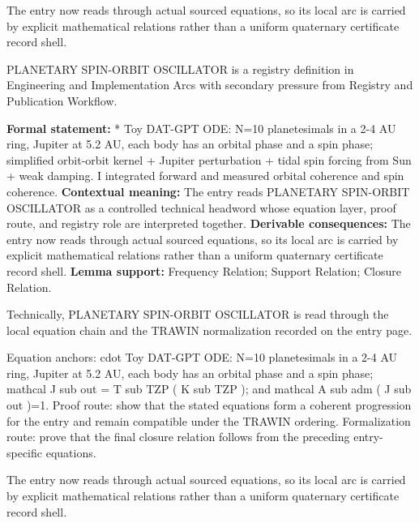 The entry now reads through actual sourced equations, so its local arc is carried by explicit mathematical relations rather than a uniform quaternary certificate record shell.
\clearpage


\begingroup\small
{}
PLANETARY SPIN-ORBIT OSCILLATOR is a registry definition in Engineering and Implementation Arcs with secondary pressure from Registry and Publication Workflow.

\begingroup\footnotesize\setlength{\emergencystretch}{3em}\sloppy
\textbf{Formal statement:} * Toy DAT-GPT ODE: N=10 planetesimals in a 2-4 AU ring, Jupiter at 5.2 AU, each body has an orbital phase and a spin phase; simplified orbit-orbit kernel + Jupiter perturbation + tidal spin forcing from Sun + weak damping. I integrated forward and measured orbital coherence and spin coherence. \textbf{Contextual meaning:} The entry reads PLANETARY SPIN-ORBIT OSCILLATOR as a controlled technical headword whose equation layer, proof route, and registry role are interpreted together. \textbf{Derivable consequences:} The entry now reads through actual sourced equations, so its local arc is carried by explicit mathematical relations rather than a uniform quaternary certificate record shell. \textbf{Lemma support:} Frequency Relation; Support Relation; Closure Relation.\par
\endgroup

Technically, PLANETARY SPIN-ORBIT OSCILLATOR is read through the local equation chain and the TRAWIN normalization recorded on the entry page.

Equation anchors: cdot Toy DAT-GPT ODE: N=10 planetesimals in a 2-4 AU ring, Jupiter at 5.2 AU, each body has an orbital phase and a spin phase; mathcal J sub out = T sub TZP ( K sub TZP ); and mathcal A sub adm ( J sub out )=1. Proof route: show that the stated equations form a coherent progression for the entry and remain compatible under the TRAWIN ordering. Formalization route: prove that the final closure relation follows from the preceding entry-specific equations.

The entry now reads through actual sourced equations, so its local arc is carried by explicit mathematical relations rather than a uniform quaternary certificate record shell.
\endgroup

